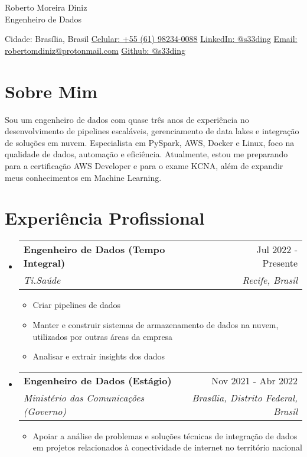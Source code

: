 \documentclass[letterpaper,11pt]{article}%
\makeatletter
\newcommand{\resumeItem}[1]{\item{#1 \vspace{-3pt}}}%
\newcommand{\resumeSubheading}[4]{\vspace{-1pt}\item\begin{tabular*}{0.97\textwidth}[t]{l@{\extracolsep{\fill}}r}\textbf{#1} & #2 \\\textit{\small #3} & \textit{\small #4} \\\end{tabular*}\vspace{-8pt}}%
\newcommand{\resumeSubHeadingListStart}{\begin{itemize}[leftmargin=0.15in, label={}, itemsep=0pt, parsep=0pt]}%
\newcommand{\resumeSubHeadingListEnd}{\end{itemize}}%
\newcommand{\resumeItemListStart}{\begin{itemize}[itemsep=0pt, parsep=0pt]}%
\newcommand{\resumeItemListEnd}{\end{itemize}\vspace{-1pt}}%
\makeatother
\begin{document}
%
\normalsize%
\section*{}%
\label{sec:}%
\begin{center}%
{\LARGE Roberto Moreira Diniz} \\ \vspace{5pt}%
{\large Engenheiro de Dados} \\ \vspace{5pt}%
\end{center}%
\begin{center}%
\small%
Cidade: Brasília, Brasil \quad \textbullet \quad \href{https://wa.me/qr/UYOUX2DZ7BYHI1}{Celular: +55 (61) 98234-0088} \quad \textbullet \quad \href{https://www.linkedin.com/in/s33ding/}{LinkedIn: @s33ding} \quad \textbullet \quad \href{mailto:robertomdiniz@protonmail.com}{Email: robertomdiniz@protonmail.com} \quad \textbullet \quad \href{https://github.com/s33ding}{Github: @s33ding}%
\normalsize%
\end{center}

%
\section*{Sobre Mim}%
\label{sec:SobreMim}%
Sou um engenheiro de dados com quase três anos de experiência no desenvolvimento de pipelines escaláveis, gerenciamento de data lakes e integração de soluções em nuvem. Especialista em PySpark, AWS, Docker e Linux, foco na qualidade de dados, automação e eficiência. Atualmente, estou me preparando para a certificação AWS Developer e para o exame KCNA, além de expandir meus conhecimentos em Machine Learning.

%
\section*{Experiência Profissional}%
\label{sec:ExperinciaProfissional}%
\resumeSubHeadingListStart%
\resumeSubheading{Engenheiro de Dados (Tempo Integral)}{Jul 2022 - Presente}{Ti.Saúde}{Recife, Brasil}%
\resumeItemListStart%
\resumeItem{Criar pipelines de dados}%
\resumeItem{Manter e construir sistemas de armazenamento de dados na nuvem, utilizados por outras áreas da empresa}%
\resumeItem{Analisar e extrair insights dos dados}%
\resumeItemListEnd%
\resumeSubheading{Engenheiro de Dados (Estágio)}{Nov 2021 - Abr 2022}{Ministério das Comunicações (Governo)}{Brasília, Distrito Federal, Brasil}%
\resumeItemListStart%
\resumeItem{Apoiar a análise de problemas e soluções técnicas de integração de dados em projetos relacionados à conectividade de internet no território nacional}%
\resumeItemListEnd%
\resumeSubHeadingListEnd
\end{document}
